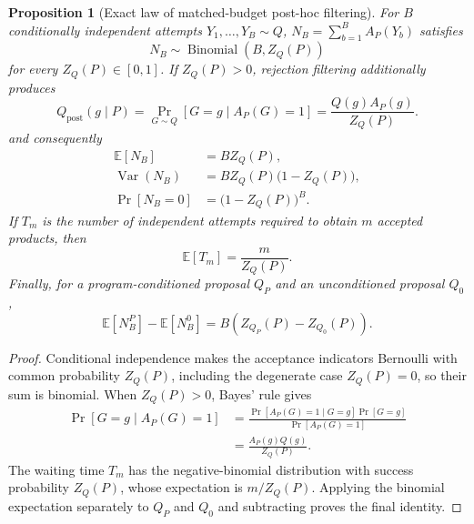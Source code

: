 \documentclass{article}
\newtheorem{proposition}[theorem]{Proposition}
\begin{document}
\begin{proposition}[Exact law of matched-budget post-hoc filtering]
\label{prop:posthoc-budget}
For $B$ conditionally independent attempts $Y_1,\ldots,Y_B\sim Q$,
$N_B=\sum_{b=1}^BA_P(Y_b)$ satisfies
\begin{equation}
    N_B\sim\operatorname{Binomial}(B,Z_Q(P))
\end{equation}
for every $Z_Q(P)\in[0,1]$. If $Z_Q(P)>0$, rejection filtering additionally produces
\begin{equation}
    Q_{\mathrm{post}}(g\mid P)
    =
    \Pr_{G\sim Q}[G=g\mid A_P(G)=1]
    =
    \frac{Q(g)A_P(g)}{Z_Q(P)}.
\end{equation}
and consequently
\begin{align}
    \mathbb E[N_B]
    &=BZ_Q(P),\\
    \operatorname{Var}(N_B)
    &=BZ_Q(P)\bigl(1-Z_Q(P)\bigr),\\
    \Pr[N_B=0]
    &=\bigl(1-Z_Q(P)\bigr)^B.
\end{align}
If $T_m$ is the number of independent attempts required to obtain $m$ accepted products, then
\begin{equation}
    \mathbb E[T_m]
    =
    \frac{m}{Z_Q(P)}.
\end{equation}
Finally, for a program-conditioned proposal $Q_P$ and an unconditioned proposal $Q_0$,
\begin{equation}
    \mathbb E[N_B^{P}]
    -
    \mathbb E[N_B^{0}]
    =
    B\left(
        Z_{Q_P}(P)-Z_{Q_0}(P)
    \right).
\end{equation}
\end{proposition}

\begin{proof}
Conditional independence makes the acceptance indicators Bernoulli with common probability
$Z_Q(P)$, including the degenerate case $Z_Q(P)=0$, so their sum is binomial. When $Z_Q(P)>0$,
Bayes' rule gives
\begin{align}
    \Pr[G=g\mid A_P(G)=1]
    &=
    \frac{
        \Pr[A_P(G)=1\mid G=g]\Pr[G=g]
    }{
        \Pr[A_P(G)=1]
    }\\
    &=
    \frac{A_P(g)Q(g)}{Z_Q(P)}.
\end{align}
The waiting time $T_m$ has the negative-binomial distribution with success probability $Z_Q(P)$,
whose expectation is $m/Z_Q(P)$.
Applying the binomial expectation separately to $Q_P$ and $Q_0$ and subtracting proves the final
identity.
\end{proof}
\end{document}
